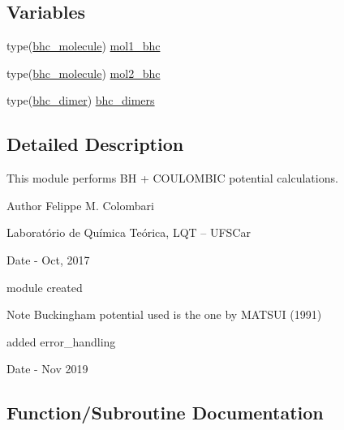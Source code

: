 \subsection*{Variables}
\begin{DoxyCompactItemize}
\item 
type(\hyperlink{structmod__pot__bhc_1_1bhc__molecule}{bhc\+\_\+molecule}) \hyperlink{namespacemod__pot__bhc_a1624e56c037fde88375d7844e2846ab2}{mol1\+\_\+bhc}
\item 
type(\hyperlink{structmod__pot__bhc_1_1bhc__molecule}{bhc\+\_\+molecule}) \hyperlink{namespacemod__pot__bhc_af61e65117b770d57d6ec81037ca6590b}{mol2\+\_\+bhc}
\item 
type(\hyperlink{structmod__pot__bhc_1_1bhc__dimer}{bhc\+\_\+dimer}) \hyperlink{namespacemod__pot__bhc_a3fcd8470e5904559d0c2c3dd1a517d2d}{bhc\+\_\+dimers}
\end{DoxyCompactItemize}


\subsection{Detailed Description}
This module performs BH + C\+O\+U\+L\+O\+M\+B\+IC potential calculations. 

\begin{DoxyAuthor}{Author}
Felippe M. Colombari
\begin{DoxyItemize}
\item Laboratório de Química Teórica, L\+QT -- U\+F\+S\+Car 
\end{DoxyItemize}
\end{DoxyAuthor}
\begin{DoxyDate}{Date}
-\/ Oct, 2017
\begin{DoxyItemize}
\item module created 
\end{DoxyItemize}
\end{DoxyDate}
\begin{DoxyNote}{Note}
Buckingham potential used is the one by M\+A\+T\+S\+UI (1991) 

added error\+\_\+handling 
\end{DoxyNote}
\begin{DoxyDate}{Date}
-\/ Nov 2019 
\end{DoxyDate}


\subsection{Function/\+Subroutine Documentation}
\mbox{\label{namespacemod__pot__bhc_af0819f829c162a751bfd89f7985103dc}} 
